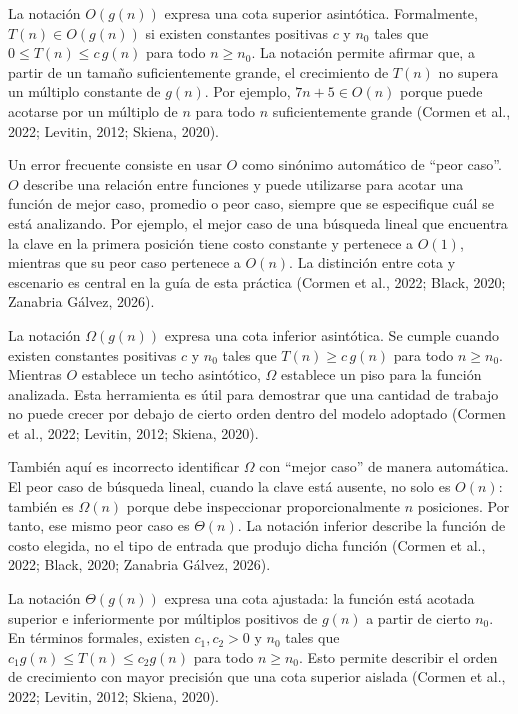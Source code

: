La notación $O(g(n))$ expresa una cota superior asintótica. Formalmente, $T(n)\in O(g(n))$ si existen constantes positivas $c$ y $n_0$ tales que $0\le T(n)\le c\,g(n)$ para todo $n\ge n_0$. La notación permite afirmar que, a partir de un tamaño suficientemente grande, el crecimiento de $T(n)$ no supera un múltiplo constante de $g(n)$. Por ejemplo, $7n+5\in O(n)$ porque puede acotarse por un múltiplo de $n$ para todo $n$ suficientemente grande (Cormen et al., 2022; Levitin, 2012; Skiena, 2020).

Un error frecuente consiste en usar $O$ como sinónimo automático de ``peor caso''. $O$ describe una relación entre funciones y puede utilizarse para acotar una función de mejor caso, promedio o peor caso, siempre que se especifique cuál se está analizando. Por ejemplo, el mejor caso de una búsqueda lineal que encuentra la clave en la primera posición tiene costo constante y pertenece a $O(1)$, mientras que su peor caso pertenece a $O(n)$. La distinción entre cota y escenario es central en la guía de esta práctica (Cormen et al., 2022; Black, 2020; Zanabria Gálvez, 2026).

La notación $\Omega(g(n))$ expresa una cota inferior asintótica. Se cumple cuando existen constantes positivas $c$ y $n_0$ tales que $T(n)\ge c\,g(n)$ para todo $n\ge n_0$. Mientras $O$ establece un techo asintótico, $\Omega$ establece un piso para la función analizada. Esta herramienta es útil para demostrar que una cantidad de trabajo no puede crecer por debajo de cierto orden dentro del modelo adoptado (Cormen et al., 2022; Levitin, 2012; Skiena, 2020).

También aquí es incorrecto identificar $\Omega$ con ``mejor caso'' de manera automática. El peor caso de búsqueda lineal, cuando la clave está ausente, no solo es $O(n)$: también es $\Omega(n)$ porque debe inspeccionar proporcionalmente $n$ posiciones. Por tanto, ese mismo peor caso es $\Theta(n)$. La notación inferior describe la función de costo elegida, no el tipo de entrada que produjo dicha función (Cormen et al., 2022; Black, 2020; Zanabria Gálvez, 2026).

La notación $\Theta(g(n))$ expresa una cota ajustada: la función está acotada superior e inferiormente por múltiplos positivos de $g(n)$ a partir de cierto $n_0$. En términos formales, existen $c_1,c_2>0$ y $n_0$ tales que $c_1g(n)\le T(n)\le c_2g(n)$ para todo $n\ge n_0$. Esto permite describir el orden de crecimiento con mayor precisión que una cota superior aislada (Cormen et al., 2022; Levitin, 2012; Skiena, 2020).

